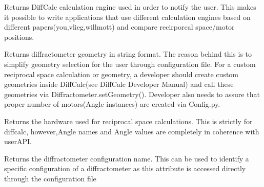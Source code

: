 \documentclass[letterpaper,10pt,english]{sphinxmanual}
\begin{document}
\begin{fulllineitems}
\begin{fulllineitems}
\end{fulllineitems}


\begin{fulllineitems}
\label{Manual:Diffractometer.Diffractometer.getEngine}
Returns DiffCalc calculation engine used in order to notify the user. This makes it possible to write applications that use different calculation engines based on different papers(you,vlieg,willmott) and compare recirporcal space/motor positions.

\end{fulllineitems}


\begin{fulllineitems}
\label{Manual:Diffractometer.Diffractometer.getGeometry}
Returns diffractometer geometry in string format. The reason behind this is to simplify geometry selection for the user through configuration file. For a custom reciprocal space calculation or geometry, a developer should create custom geometries inside DiffCalc(see DiffCalc Developer Manual) and call these geometries via Diffractometer.setGeometry(). Developer also needs to assure that proper number of motors(Angle instances) are created via Config.py.

\end{fulllineitems}


\begin{fulllineitems}
\label{Manual:Diffractometer.Diffractometer.getHardware}
Returns the hardware used for reciprocal space calculations. This is strictly for diffcalc,
however,Angle names and Angle values are completely in coherence with userAPI.

\end{fulllineitems}


\begin{fulllineitems}
\label{Manual:Diffractometer.Diffractometer.getName}
Returns the diffractometer configuration name. This can be used to identify a specific configuration of a diffractometer as this attribute is accessed directly through the configuration file


\end{fulllineitems}
\end{fulllineitems}
\end{document}

